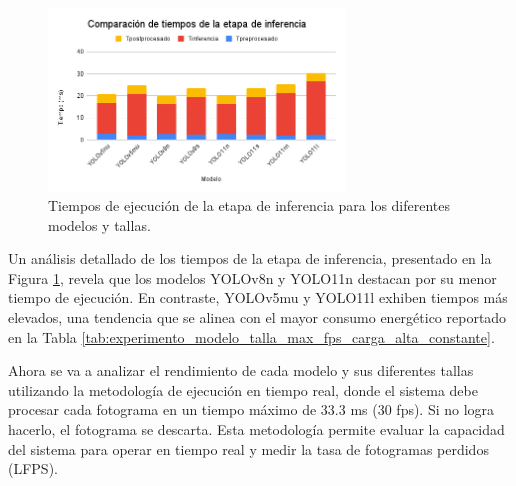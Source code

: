 \documentclass[11pt,spanish,listoffigures,listoftables]{tfgetsinf}
\begin{document}
\begin{figure}[H]
   \centering
   \includegraphics[width=0.7\textwidth]{images/analisis_de_la_solucion/modelo_talla/tiempos_inferencia.png}
   \caption[Tiempos de ejecución de la etapa de inferencia para los diferentes modelos y tallas]{Tiempos de ejecución de la etapa de inferencia para los diferentes modelos y tallas.}
   \label{fig:tiempos_inferencia}
\end{figure}
Un análisis detallado de los tiempos de la etapa de inferencia, presentado en la Figura \ref{fig:tiempos_inferencia}, revela que los modelos YOLOv8n y YOLO11n destacan por su menor tiempo de ejecución. En contraste, YOLOv5mu y YOLO11l exhiben tiempos más elevados, una tendencia que se alinea con el mayor consumo energético reportado en la Tabla \ref{tab:experimento_modelo_talla_max_fps_carga_alta_constante}.

Ahora se va a analizar el rendimiento de cada modelo y sus diferentes tallas utilizando la metodología de ejecución en tiempo real, donde el sistema debe procesar cada fotograma en un tiempo máximo de 33.3 ms (30 fps). Si no logra hacerlo, el fotograma se descarta. Esta metodología permite evaluar la capacidad del sistema para operar en tiempo real y medir la tasa de fotogramas perdidos (LFPS).
\end{document}

